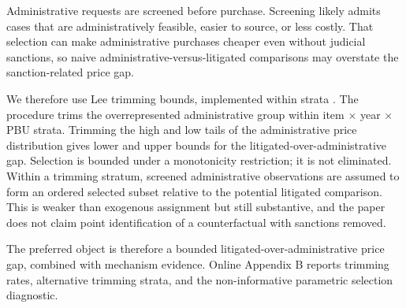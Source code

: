 Administrative requests are screened before purchase. Screening likely admits cases that are administratively feasible, easier to source, or less costly. That selection can make administrative purchases cheaper even without judicial sanctions, so naive administrative-versus-litigated comparisons may overstate the sanction-related price gap.

We therefore use Lee trimming bounds, implemented within strata \citep{lee2009training}. The procedure trims the overrepresented administrative group within item $\times$ year $\times$ PBU strata. Trimming the high and low tails of the administrative price distribution gives lower and upper bounds for the litigated-over-administrative gap. Selection is bounded under a monotonicity restriction; it is not eliminated. Within a trimming stratum, screened administrative observations are assumed to form an ordered selected subset relative to the potential litigated comparison. This is weaker than exogenous assignment but still substantive, and the paper does not claim point identification of a counterfactual with sanctions removed.

The preferred object is therefore a bounded litigated-over-administrative price gap, combined with mechanism evidence. Online Appendix B reports trimming rates, alternative trimming strata, and the non-informative parametric selection diagnostic.
